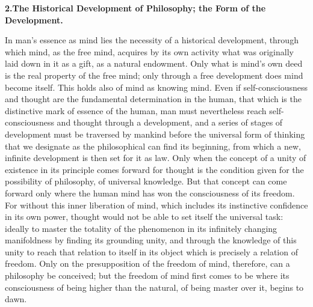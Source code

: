 \divrule

\begin{center}
\textbf{2.\enspace The Historical Development of Philosophy; the Form of the Development.}
\end{center}

In man's essence as mind lies the necessity of a historical
development, through which mind, as the free mind, acquires by its own
activity what was originally laid down in it as a gift, as a natural
endowment. Only what is mind's own deed is the real property of the free
mind; only through a free development does mind become itself. This
holds also of mind as knowing mind. Even if self-consciousness and
thought are the fundamental determination in the human, that which is
the distinctive mark of essence of the human, man must nevertheless
reach self-consciousness and thought through a development, and a series
of stages of development must be traversed by mankind before the
universal form of thinking that we designate as the philosophical can
find its beginning, from which a new, infinite development is then set
for it as law. Only when the concept of a unity of existence in its
principle comes forward for thought is the condition given for
the possibility of philosophy, of universal knowledge. But that concept
can come forward only where the human mind has won the consciousness of
its freedom. For without this inner liberation of mind, which includes
its instinctive confidence in its own power, thought would not be able
to set itself the universal task: ideally to master the totality of the
phenomenon in its infinitely changing manifoldness by finding its
grounding unity, and through the knowledge of this unity to reach that
relation to itself in its object which is precisely a relation of
freedom. Only on the presupposition of the freedom of mind, therefore,
can a philosophy be conceived; but the freedom of mind first comes to be
where its consciousness of being higher than the natural, of being
master over it, begins to dawn.

